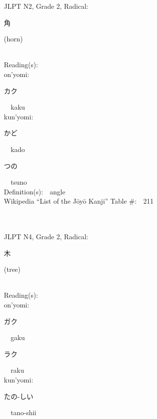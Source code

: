 \begin{multicols}{2}
{JLPT N2, Grade 2, Radical:\ \ {\begin{CJK}{UTF8}{min} 角 \end{CJK}} (horn) } \\
Reading(s):\ \ \\
{\hspace*{1em}}on'yomi:\ \ \\
{\hspace*{2em}}{\begin{CJK}{UTF8}{min} カク \end{CJK}}\ \ kaku\ \ \\
{\hspace*{1em}}kun'yomi:\ \ \\
{\hspace*{2em}}{\begin{CJK}{UTF8}{min} かど \end{CJK}}\ \ kado\ \ \\
{\hspace*{2em}}{\begin{CJK}{UTF8}{min} つの \end{CJK}}\ \ tsuno\ \ \\
Definition(s):\ \ angle \\
Wikipedia ``List of the J\=oy\=o Kanji'' Table \#:\ \ 211 \\
\ \ \\
{\fontsize{34pt}{40pt}  }\ \ \\  %
{JLPT N4, Grade 2, Radical:\ \ {\begin{CJK}{UTF8}{min} 木 \end{CJK}} (tree) } \\
Reading(s):\ \ \\
{\hspace*{1em}}on'yomi:\ \ \\
{\hspace*{2em}}{\begin{CJK}{UTF8}{min} ガク \end{CJK}}\ \ gaku\ \ \\
{\hspace*{2em}}{\begin{CJK}{UTF8}{min} ラク \end{CJK}}\ \ raku\ \ \\
{\hspace*{1em}}kun'yomi:\ \ \\
{\hspace*{2em}}{\begin{CJK}{UTF8}{min} たの-しい \end{CJK}}\ \ tano-shii\ \ \\

\end{multicols}
